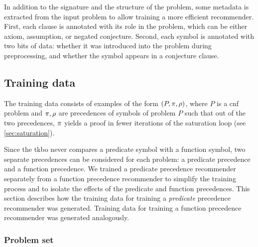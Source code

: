In addition to the signature and the structure of the problem,
some metadata is extracted from the input problem to allow training a more efficient recommender.
First, each clause is annotated with its role in the problem,
which can be either axiom, assumption, or negated conjecture.
Second, each symbol is annotated with two bits of data:
whether it was introduced into the problem during preprocessing,
and whether the symbol appears in a conjecture clause.

\subsection{Training data}

The training data consists of examples of the form $(P, \pi, \rho)$,
where $P$ is a \gls{cnf} problem and $\pi, \rho$ are precedences of symbols of problem $P$
such that out of the two precedences, $\pi$ yields a proof in fewer iterations of the saturation loop (see \cref{sec:saturation}).

Since the \gls{tkbo} never compares a predicate symbol with a function symbol,
two separate precedences can be considered for each problem:
a predicate precedence and a function precedence.
We trained a predicate precedence recommender separately from a function precedence recommender
to simplify the training process and to isolate the effects of the predicate and function precedences.
This section describes how the training data for training a \emph{predicate} precedence recommender was generated.
Training data for training a function precedence recommender was generated analogously.

\subsubsection{Problem set}


